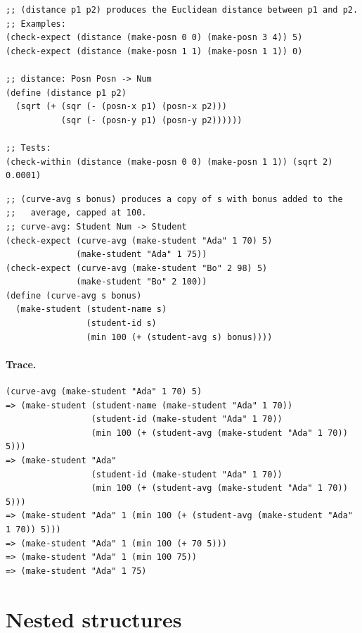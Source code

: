 \begin{example}
\begin{lstlisting}[style=racket]
;; (distance p1 p2) produces the Euclidean distance between p1 and p2.
;; Examples:
(check-expect (distance (make-posn 0 0) (make-posn 3 4)) 5)
(check-expect (distance (make-posn 1 1) (make-posn 1 1)) 0)

;; distance: Posn Posn -> Num
(define (distance p1 p2)
  (sqrt (+ (sqr (- (posn-x p1) (posn-x p2)))
           (sqr (- (posn-y p1) (posn-y p2))))))

;; Tests:
(check-within (distance (make-posn 0 0) (make-posn 1 1)) (sqrt 2) 0.0001)
\end{lstlisting}
\end{example}

\begin{example}
\begin{lstlisting}[style=racket]
;; (curve-avg s bonus) produces a copy of s with bonus added to the
;;   average, capped at 100.
;; curve-avg: Student Num -> Student
(check-expect (curve-avg (make-student "Ada" 1 70) 5)
              (make-student "Ada" 1 75))
(check-expect (curve-avg (make-student "Bo" 2 98) 5)
              (make-student "Bo" 2 100))
(define (curve-avg s bonus)
  (make-student (student-name s)
                (student-id s)
                (min 100 (+ (student-avg s) bonus))))
\end{lstlisting}
\end{example}

\paragraph{Trace.}
\begin{lstlisting}[style=racket]
(curve-avg (make-student "Ada" 1 70) 5)
=> (make-student (student-name (make-student "Ada" 1 70))
                 (student-id (make-student "Ada" 1 70))
                 (min 100 (+ (student-avg (make-student "Ada" 1 70)) 5)))
=> (make-student "Ada"
                 (student-id (make-student "Ada" 1 70))
                 (min 100 (+ (student-avg (make-student "Ada" 1 70)) 5)))
=> (make-student "Ada" 1 (min 100 (+ (student-avg (make-student "Ada" 1 70)) 5)))
=> (make-student "Ada" 1 (min 100 (+ 70 5)))
=> (make-student "Ada" 1 (min 100 75))
=> (make-student "Ada" 1 75)
\end{lstlisting}

\section{Nested structures}

